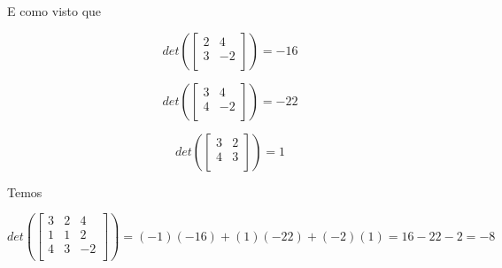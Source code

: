 \documentclass[11pt]{article}
\begin{document}
\begin{exerc}
\begin{enumerate}[a.]
E como visto que

$$det(\begin{bmatrix}
	2 & 4\\
	3 & -2\\
\end{bmatrix})
= -16$$

$$det(\begin{bmatrix}
	3 & 4\\
	4 & -2\\
\end{bmatrix})
= -22$$

$$det(\begin{bmatrix}
	3 & 2\\
	4 & 3\\
\end{bmatrix})
= 1$$

Temos

$$det(\begin{bmatrix}
	3 & 2 & 4\\
	1 & 1 & 2\\
	4 & 3 & -2\\
\end{bmatrix})
=
(-1)(-16)+(1)(-22)+(-2)(1) = 16 - 22 - 2 = -8$$

\end{enumerate}
\end{exerc}

\newpage
\end{document}
